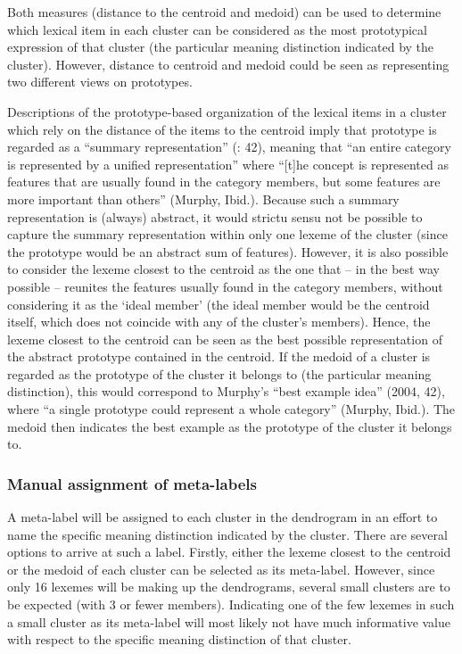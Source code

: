 Both measures (distance to the centroid and medoid) can be used to determine which lexical item in each cluster can be considered as the most prototypical expression of that cluster (the particular meaning distinction indicated by the cluster). However, distance to centroid and medoid could be seen as representing two different views on prototypes.



Descriptions of the prototype-based organization of the lexical items in a cluster which rely on the distance of the items to the centroid imply that prototype is regarded as a “summary representation” (\citealt{murphy_big_2004}: 42), meaning that “an entire category is represented by a unified representation” where “[t]he concept is represented as features that are usually found in the category members, but some features are more important than others” (Murphy, Ibid.). Because such a summary representation is (always) abstract, it would strictu sensu not be possible to capture the summary representation within only one lexeme of the cluster (since the prototype would be an abstract sum of features). However, it is also possible to consider the lexeme closest to the centroid as the one that – in the best way possible – reunites the features usually found in the category members, without considering it as the ‘ideal member’ (the ideal member would be the centroid itself, which does not coincide with any of the cluster’s members). Hence, the lexeme closest to the centroid can be seen as the best possible representation of the abstract prototype contained in the centroid. If the medoid of a cluster is regarded as the prototype of the cluster it belongs to (the particular meaning distinction), this would correspond to Murphy’s “best example idea” (2004, 42), where “a single prototype could represent a whole category” (Murphy, Ibid.). The medoid then indicates the best example as the prototype of the cluster it belongs to.


\subsubsection{\label{sec:3.8.1.4}  Manual assignment of meta-labels}

A meta-label will be assigned to each cluster in the dendrogram in an effort to name the specific meaning distinction indicated by the cluster. There are several options to arrive at such a label. Firstly, either the lexeme closest to the centroid or the medoid of each cluster can be selected as its meta-label. However, since only 16 lexemes will be making up the dendrograms, several small clusters are to be expected (with 3 or fewer members). Indicating one of the few lexemes in such a small cluster as its meta-label will most likely not have much informative value with respect to the specific meaning distinction of that cluster.



